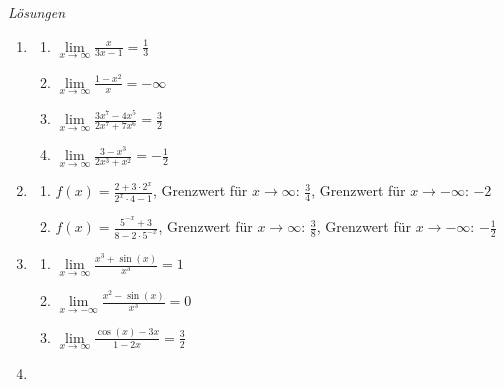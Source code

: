 \clearpage
\emph{Lösungen}
\begin{enumerate}
    \item 

\begin{enumerate}
    \item $\lim\limits_{x \to \infty} \frac{x}{3x - 1} = \frac{1}{3}$
    \item $\lim\limits_{x \to \infty} \frac{1 - x^2}{x} = -\infty$
    \item $\lim\limits_{x \to \infty} \frac{3x^7 - 4x^5}{2x^7 + 7x^6} = \frac{3}{2}$
    \item $\lim\limits_{x \to \infty} \frac{3 - x^3}{2x^3 + x^2} = -\frac{1}{2}$
\end{enumerate}

\item

\begin{enumerate}
    \item $f(x) = \frac{2 + 3 \cdot 2^x}{2^x \cdot 4 - 1}$, Grenzwert für $x\to \infty$: $\frac{3}{4}$, Grenzwert für $x\to-\infty$: $-2$
    \item $f(x) = \frac{5^{-x} + 3}{8 - 2 \cdot 5^{-x}}$, Grenzwert für $x\to \infty$: $\frac{3}{8}$, Grenzwert für $x\to-\infty$: $-\frac{1}{2}$
\end{enumerate}

\item

\begin{enumerate}
    \item $\lim\limits_{x \to \infty} \frac{x^3 + \sin(x)}{x^3} = 1$
    \item $\lim\limits_{x \to -\infty} \frac{x^2 - \sin(x)}{x^3} = 0$
    \item $\lim\limits_{x \to \infty} \frac{\cos(x) - 3x}{1 - 2x} = \frac{3}{2}$
\end{enumerate}

\item


\end{enumerate}

